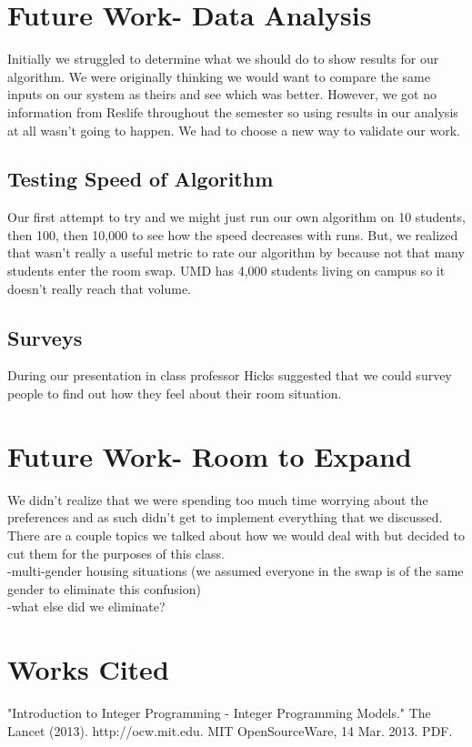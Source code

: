 \documentclass[12pt]{article}
\begin{document}
\begin{multicols}{2}
\section{Future Work- Data Analysis}
Initially we struggled to determine what we should do to show results for our algorithm. We were originally thinking we would want to compare the same inputs on our system as theirs and see which was better. However, we got no information from Reslife throughout the semester so using results in our analysis at all wasn't going to happen. We had to choose a new way to validate our work.

\subsection{Testing Speed of Algorithm}
Our first attempt to try and  we might just run our own algorithm on 10 students, then 100, then 10,000 to see how the speed decreases with runs. But, we realized that wasn't really a useful metric to rate our algorithm by because not that many students enter the room swap. UMD has 4,000 students living on campus so it doesn't really reach that volume.

\subsection{Surveys}
During our presentation in class professor Hicks suggested that we could survey people to find out how they feel about their room situation.

\section{Future Work- Room to Expand}
We didn't realize that we were spending too much time worrying about the preferences and as such didn't get to implement everything that we discussed. There are a couple topics we talked about how we would deal with but decided to cut them for the purposes of this class.\\
-multi-gender housing situations (we assumed everyone in the swap is of the same gender to eliminate this confusion)\\
-what else did we eliminate?

\section{Works Cited}
"Introduction to Integer Programming - Integer Programming Models." The Lancet (2013). http://ocw.mit.edu. MIT OpenSourceWare, 14 Mar. 2013. PDF.

\end{multicols}
\end{document}

